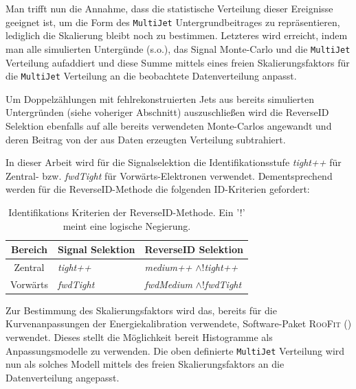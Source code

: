 Man trifft nun die Annahme, dass die statistische Verteilung dieser Ereignisse
geeignet ist, um die Form des \texttt{MultiJet} Untergrundbeitrages zu
repräsentieren, lediglich die Skalierung bleibt noch zu bestimmen. Letzteres
wird erreicht, indem man alle simulierten Untergünde (s.o.), das Signal
Monte-Carlo und die \texttt{MultiJet} Verteilung aufaddiert und diese Summe
mittels eines freien Skalierungsfaktors für die \texttt{MultiJet} Verteilung an
die beobachtete Datenverteilung anpasst.

Um Doppelzählungen mit fehlrekonstruierten Jets aus bereits simulierten
Untergründen (siehe voheriger Abschnitt) auszuschließen wird die ReverseID
Selektion ebenfalls auf alle bereits verwendeten Monte-Carlos angewandt und
deren Beitrag von der aus Daten erzeugten Verteilung subtrahiert.

In dieser Arbeit wird für die Signalselektion die Identifikationsstufe
\textit{tight++} für Zentral- bzw. \textit{fwdTight} für Vorwärts-Elektronen
verwendet. Dementsprechend werden für die ReverseID-Methode die folgenden
ID-Kriterien gefordert:
\begin{table}[h]
    \centering
    \begin{tabular}{
                        |c|
                        >{\centering\arraybackslash}p{45mm} |
                        >{\centering\arraybackslash}p{45mm} |
                   }
        \hline
        \bf{Bereich} & \bf{Signal Selektion} & \bf{ReverseID Selektion} \\
        \hline\hline
        Zentral  & \it{tight++}  & \textit{medium++} $\wedge$!\it{tight++} \\
        \hline
        Vorwärts & \it{fwdTight} & \textit{fwdMedium} $\wedge$!\it{fwdTight} \\
        \hline
    \end{tabular}
    \caption[Identifikations Kriterien der ReverseID-Methode]
        {Identifikations Kriterien der ReverseID-Methode. Ein '!' meint eine
        logische Negierung.}
    \label{tab:reverseID}
\end{table}

Zur Bestimmung des Skalierungsfaktors wird das, bereits für die
Kurvenanpassungen der Energiekalibration verwendete, Software-Paket
\textsc{RooFit} (\cite{Verkerke:2003ir}) verwendet. Dieses stellt die
Möglichkeit bereit Histogramme als Anpassungsmodelle zu verwenden. Die oben
definierte \texttt{MultiJet} Verteilung wird nun als solches Modell mittels des
freien Skalierungsfaktors an die Datenverteilung angepasst.

